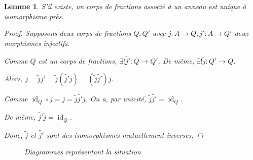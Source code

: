 \documentclass{report}
\newtheorem*{lem}{Lemme}
\theoremstyle{definition}
\theoremstyle{remark}
\begin{document}
	\begin{lem}
		S'il existe, un corps de fractions associ\'e \`a un anneau est unique \`a isomorphisme pr\`es.
		\begin{proof}
			Supposons deux corps de fractions $Q,Q'$ avec $j:A\to Q,j':A\to Q'$ deux morphismes injectifs.

			Comme $Q$ est un corps de fractions, $\exists!\widetilde{j'}:Q\to Q'$. De m\^eme, $\exists!\widetilde{j}:Q'\to Q$.

			Alors, $j = \widetilde{j} j' = \widetilde{j} (\widetilde{j'} j) = (\widetilde{j} \widetilde{j'}) j$.

			Comme $\operatorname{id}_Q \circ j = j = \widetilde{j} \widetilde{j'} j$. On a, par unicit\'e, $\widetilde{j} \widetilde{j'} = \operatorname{id}_Q$.

			De m\^eme, $\widetilde{j'} \widetilde{j} = \operatorname{id}_Q$.

			Donc, $\widetilde{j}$ et $\widetilde{j'}$ sont des isomorphismes mutuellement inverses.
		\end{proof}
		\begin{figure}[h]
			\centering
			\hspace{2cm}
			\hspace{2cm}
			\caption{Diagrammes repr\'esentant la situation}
		\end{figure}
	\end{lem}
\end{document}
